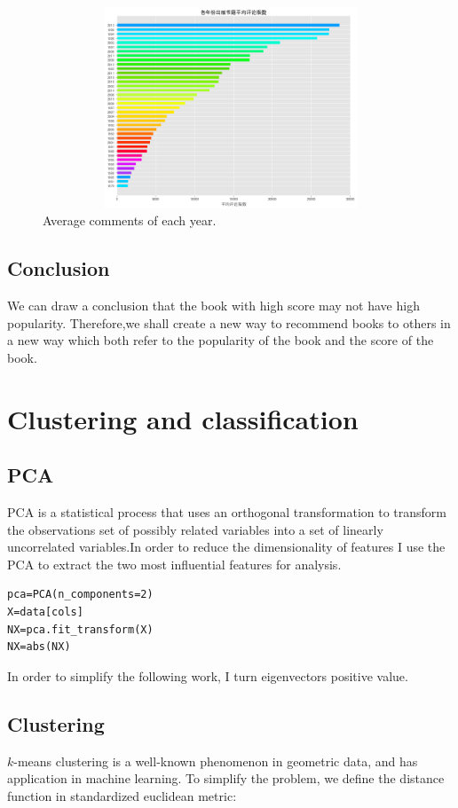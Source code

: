 \documentclass[12pt, a4paper]{article}
\begin{document}
\begin{figure}[ht]
    \centering
    \includegraphics[width=12cm,height=6cm]{p6.png}
    \caption{Average comments of each year.}
\end{figure}

\newpage{}

\subsection{Conclusion}
We can draw a conclusion that the book with high score may not have high popularity.
Therefore,we shall create a new way to recommend books to others in a new way 
which both refer to the popularity of the book and the score of the book.



\newpage
\section{Clustering and classification}





\subsection{PCA}
PCA is a statistical process\cite{bishop2006pattern} that uses 
an orthogonal transformation to transform 
the observations set of possibly related variables 
into a set of linearly uncorrelated variables.In order to 
reduce the dimensionality of features I use the PCA
to extract the two most influential features for analysis.
\lstset{language=Python}
\begin{lstlisting}[caption={PCA}]
pca=PCA(n_components=2)
X=data[cols]
NX=pca.fit_transform(X)
NX=abs(NX)
\end{lstlisting}
In order to simplify the following work, I turn eigenvectors positive value.


\subsection{Clustering}
      $k$-means clustering\cite{wagstaff2001constrained} is a well-known phenomenon in geometric data, and has application in machine learning. 
        To simplify the problem, we define the distance function in standardized 
        euclidean metric:
\end{document}
